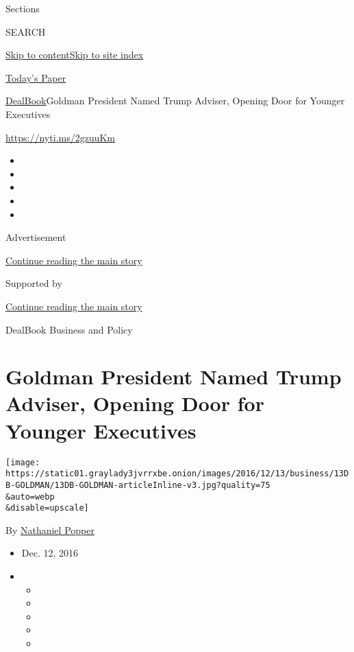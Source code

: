 Sections

SEARCH

\protect\hyperlink{site-content}{Skip to
content}\protect\hyperlink{site-index}{Skip to site index}

\href{https://myaccount.nytimes3xbfgragh.onion/auth/login?response_type=cookie\&client_id=vi}{}

\href{https://www.nytimes3xbfgragh.onion/section/todayspaper}{Today's
Paper}

\href{/section/business/dealbook}{DealBook}\textbar{}Goldman President
Named Trump Adviser, Opening Door for Younger Executives

\url{https://nyti.ms/2gzuuKm}

\begin{itemize}
\item
\item
\item
\item
\item
\end{itemize}

Advertisement

\protect\hyperlink{after-top}{Continue reading the main story}

Supported by

\protect\hyperlink{after-sponsor}{Continue reading the main story}

DealBook Business and Policy

\hypertarget{goldman-president-named-trump-adviser-opening-door-for-younger-executives}{%
\section{Goldman President Named Trump Adviser, Opening Door for Younger
Executives}\label{goldman-president-named-trump-adviser-opening-door-for-younger-executives}}

\texttt{[image: https://static01.graylady3jvrrxbe.onion/images/2016/12/13/business/13DB-GOLDMAN/13DB-GOLDMAN-articleInline-v3.jpg?quality=75\\\&auto=webp\\\&disable=upscale]}

By
\href{http://www.nytimes3xbfgragh.onion/by/nathaniel-popper}{Nathaniel
Popper}

\begin{itemize}
\item
  Dec. 12, 2016
\item
  \begin{itemize}
  \item
  \item
  \item
  \item
  \item
  \end{itemize}
\end{itemize}

